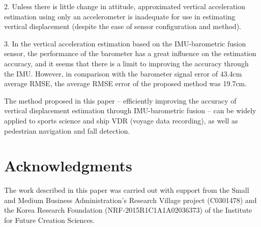 \documentclass[10pt,journal,compsoc]{IEEEtran}
\begin{document}
2. Unless there is little change in attitude, approximated vertical
acceleration estimation using only an accelerometer is inadequate for use in
estimating vertical displacement (despite the ease of sensor configuration and
method).

3. In the vertical acceleration estimation based on the IMU-barometric fusion
sensor, the performance of the barometer has a great influence on the
estimation accuracy, and it seems that there is a limit to improving the accuracy
through the IMU.  However, in comparison with the barometer signal error of
43.4cm average RMSE, the average RMSE error of the proposed method was 19.7cm.

The method proposed in this paper -- efficiently improving the accuracy of
vertical displacement estimation through IMU-barometric fusion -- can be
widely applied to sports science and ship VDR (voyage data recording), as well as
pedestrian navigation and fall detection.

\section*{Acknowledgments}

The work described in this paper was carried out with support from the Small
and Medium Business Administration's Research Village project (C0301478) and
the Korea Research Foundation (NRF-2015R1C1A1A02036373) of the Institute for
Future Creation Sciences.
\end{document}

